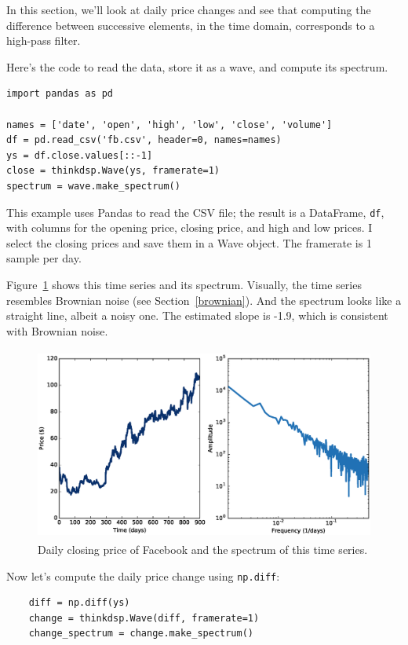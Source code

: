 \documentclass[12pt]{book}
\begin{document}
In this section, we'll look at daily price changes and
see that computing the difference between successive elements,
in the time domain, corresponds to a high-pass filter.

Here's the code to read the data, store it as a wave, and compute its
spectrum.

\begin{verbatim}
import pandas as pd

names = ['date', 'open', 'high', 'low', 'close', 'volume']
df = pd.read_csv('fb.csv', header=0, names=names)
ys = df.close.values[::-1]
close = thinkdsp.Wave(ys, framerate=1)
spectrum = wave.make_spectrum()
\end{verbatim}

This example uses Pandas to read the CSV file; the
result is a DataFrame, {\tt df}, with columns for the opening
price, closing price, and high and low prices.  I select the closing
prices and save them in a Wave object.
The framerate is 1 sample per day.  

Figure~\ref{fig.diff_int1} shows
this time series and its spectrum.
Visually, the time series resembles Brownian noise (see
Section~\ref{brownian}).
And the spectrum looks like a straight
line, albeit a noisy one.  The estimated slope is -1.9,
which is consistent with Brownian noise.

\begin{figure}
\centerline{\includegraphics[height=2.5in]{figs/diff_int1.eps}}
\caption{Daily closing price of Facebook and the spectrum of this time
  series.}
\label{fig.diff_int1}
\end{figure}

Now let's compute the daily price change using {\tt np.diff}:

\begin{verbatim}
    diff = np.diff(ys)
    change = thinkdsp.Wave(diff, framerate=1)
    change_spectrum = change.make_spectrum()
\end{verbatim}
\end{document}
